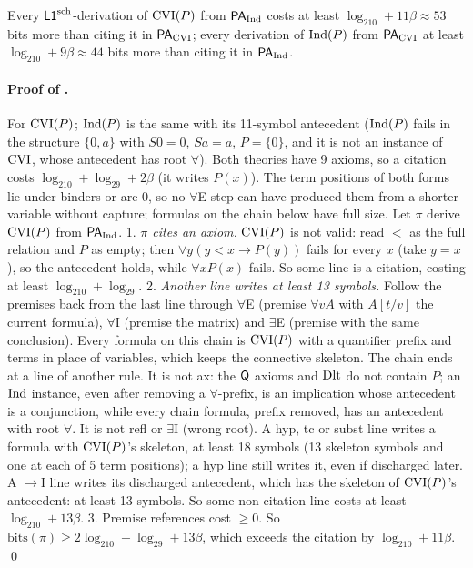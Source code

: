 \begin{proposition}\pabrk{}\label{prop:pa:lower}
Every $\mathord{\mathsf{L1}}^{\mathrm{sch}}$-derivation of $\mathrm{CVI}(P)$ from $\mathsf{PA}_{\mathrm{Ind}}$ costs at least $\log_210+11\beta\approx53$ bits more than citing it in $\mathsf{PA}_{\mathrm{CVI}}$; every derivation of $\mathrm{Ind}(P)$ from $\mathsf{PA}_{\mathrm{CVI}}$ at least $\log_210+9\beta\approx44$ bits more than citing it in $\mathsf{PA}_{\mathrm{Ind}}$.
\end{proposition}

\paragraph{Proof of .} For $\mathrm{CVI}(P)$; $\mathrm{Ind}(P)$ is the same with its 11-symbol antecedent ($\mathrm{Ind}(P)$ fails in the structure $\{0,a\}$ with $S0=0$, $Sa=a$, $P=\{0\}$, and it is not an instance of $\mathrm{CVI}$, whose antecedent has root $\forall$). Both theories have 9 axioms, so a citation costs $\log_210+\log_29+2\beta$ (it writes $P(x)$). The term positions of both forms lie under binders or are $0$, so no $\forall$E step can have produced them from a shorter variable without capture; formulas on the chain below have full size. Let $\pi$ derive $\mathrm{CVI}(P)$ from $\mathsf{PA}_{\mathrm{Ind}}$.
1. \emph{$\pi$ cites an axiom.} $\mathrm{CVI}(P)$ is not valid: read $<$ as the full relation and $P$ as empty; then $\forall y(y<x\to P(y))$ fails for every $x$ (take $y=x$), so the antecedent holds, while $\forall xP(x)$ fails. So some line is a citation, costing at least $\log_210+\log_29$.
2. \emph{Another line writes at least 13 symbols.} Follow the premises back from the last line through $\forall$E (premise $\forall vA$ with $A[t/v]$ the current formula), $\forall$I (premise the matrix) and $\exists$E (premise with the same conclusion). Every formula on this chain is $\mathrm{CVI}(P)$ with a quantifier prefix and terms in place of variables, which keeps the connective skeleton. The chain ends at a line of another rule. It is not ax: the $\mathsf{Q}$ axioms and $\mathrm{Dlt}$ do not contain $P$; an $\mathrm{Ind}$ instance, even after removing a $\forall$-prefix, is an implication whose antecedent is a conjunction, while every chain formula, prefix removed, has an antecedent with root $\forall$. It is not refl or $\exists$I (wrong root). A hyp, tc or subst line writes a formula with $\mathrm{CVI}(P)$'s skeleton, at least 18 symbols (13 skeleton symbols and one at each of 5 term positions); a hyp line still writes it, even if discharged later. A $\to$I line writes its discharged antecedent, which has the skeleton of $\mathrm{CVI}(P)$'s antecedent: at least 13 symbols. So some non-citation line costs at least $\log_210+13\beta$.
3. Premise references cost $\ge0$. So $\mathrm{bits}(\pi)\ge2\log_210+\log_29+13\beta$, which exceeds the citation by $\log_210+11\beta$. \qed

